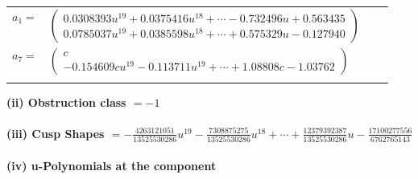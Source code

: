 \documentclass[1p]{elsarticle_modified}
\theoremstyle{definition}
\begin{document}
\begin{tabular}{m{7pt} m{180pt} m{7pt} m{180pt} }
\flushright $a_{1}=$&$\begin{pmatrix}0.0308393 u^{19}+0.0375416 u^{18}+\cdots-0.732496 u+0.563435\\0.0785037 u^{19}+0.0385598 u^{18}+\cdots+0.575329 u-0.127940\end{pmatrix}$ \\
\flushright $a_{7}=$&$\begin{pmatrix}c\\-0.154609 c u^{19}-0.113711 u^{19}+\cdots+1.08808 c-1.03762\end{pmatrix}$\\&\end{tabular}
\flushleft \textbf{(ii) Obstruction class $= -1$}\\~\\
\flushleft \textbf{(iii) Cusp Shapes $= -\frac{4263121051}{13525530286} u^{19}-\frac{7308875275}{13525530286} u^{18}+\cdots+\frac{12379392387}{13525530286} u-\frac{17100277556}{6762765143}$}\\~\\
\newpage\renewcommand{\arraystretch}{1}
\flushleft \textbf{(iv) u-Polynomials at the component}\newline \\
\end{document}
